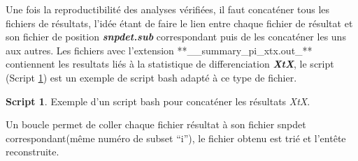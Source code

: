 \documentclass[
  openany]{book}
\theoremstyle{definition}
\theoremstyle{definition}
\newtheorem{example}{Script}[chapter]
\theoremstyle{definition}
\theoremstyle{definition}
\theoremstyle{remark}
\begin{document}
Une fois la reproductibilité des analyses vérifiées, il faut concaténer tous les fichiers de résultats, l'idée étant de faire le lien entre chaque fichier de résultat et son fichier de position \textbf{\emph{snpdet.sub}} correspondant puis de les concaténer les uns aux autres. Les fichiers avec l'extension **\_\_summary\_pi\_xtx.out\_** contiennent les resultats liés à la statistique de differenciation \textbf{\emph{XtX}}, le script (Script \ref{exm:script5}) est un exemple de script bash adapté à ce type de fichier.

\begin{example}
\protect\hypertarget{exm:script5}{}\label{exm:script5}{Exemple d'un script bash pour concaténer les résultats \emph{XtX}.}
\end{example}

Un boucle permet de coller chaque fichier résultat à son fichier snpdet correspondant(même numéro de subset ``i''), le fichier obtenu est trié et l'entête reconstruite.
\end{document}
